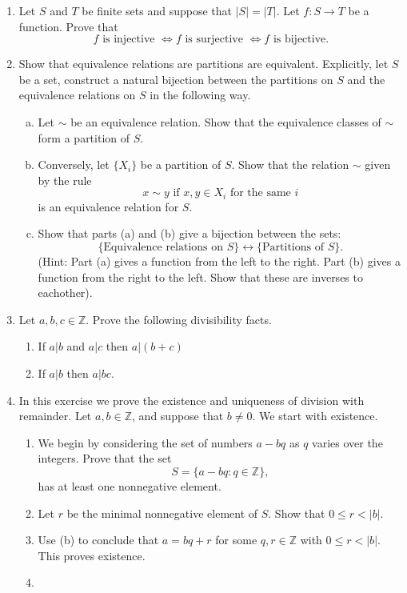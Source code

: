 \documentclass[11pt]{article}
\newtheorem*{remark}{Remark}
\newcommand{\bZ}{\mathbb{Z}}
\begin{document}
\begin{enumerate}
\begin{remark}
\end{remark}
\item{
Let $S$ and $T$ be finite sets and suppose that $|S| = |T|$.  Let $f:S\to T$ be a function.  Prove that
\[f\text{ is injective }\Leftrightarrow f\text{ is surjective }\Leftrightarrow f\text{ is bijective.}\]
}
\item Show that equivalence relations are partitions are equivalent.  Explicitly, let $S$ be a set, construct a natural bijection between the partitions on $S$ and the equivalence relations on $S$ in the following way.
\begin{enumerate}[(a)]
\item Let $\sim$ be an equivalence relation.  Show that the equivalence classes of $\sim$ form a partition of $S$.
\item Conversely, let $\{X_i\}$ be a partition of $S$.  Show that the relation $\sim$ given by the rule
\[x\sim y\text{ if }x,y\in X_i\text{ for the same }i\]
is an equivalence relation for $S$.
\item{Show that parts (a) and (b) give a bijection between the sets:
\[\{\text{Equivalence relations on }S\}\longleftrightarrow\{\text{Partitions of }S\}.\]
(Hint: Part (a) gives a function from the left to the right.  Part (b) gives a function from the right to the left.  Show that these are inverses to eachother).
}
\end{enumerate}
\item{Let $a,b,c\in\bZ$.  Prove the following divisibility facts.
\begin{enumerate}
  \item{If $a|b$ and $a|c$ then $a|(b+c)$}
  \item{If $a|b$ then $a|bc$.}
\end{enumerate}
}
\item{
In this exercise we prove the existence and uniqueness of division with remainder.  Let $a,b\in\bZ$, and suppose that $b\not=0$.  We start with existence.
\begin{enumerate}
  \item{
  We begin by considering the set of numbers $a-bq$ as $q$ varies over the integers.  Prove that the set
  \[S = \{a-bq : q\in\bZ\},\]
  has at least one nonnegative element.
  }
  \item{
  Let $r$ be the minimal nonnegative element of $S$.  Show that $0\le r< |b|$.
  }
  \item{
  Use (b) to conclude that $a = bq+r$ for some $q,r\in\bZ$ with $0\le r<|b|$.  This proves existence.
  }
  \item{
}
\end{enumerate}}
\end{enumerate}
\end{document}
